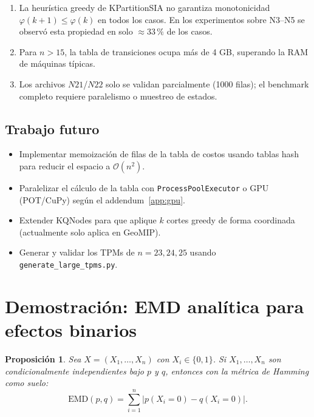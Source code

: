 \documentclass[11pt,letterpaper]{article}
\newcommand{\EMD}{\mathrm{EMD}}
\newcommand{\phi}{\varphi}
\newtheorem{proposition}{Proposición}[section]
\begin{document}
\begin{enumerate}
  \item La heurística greedy de KPartitionSIA no garantiza monotonicidad
        $\phi(k+1) \le \phi(k)$ en todos los casos.  En los experimentos
        sobre N3--N5 se observó esta propiedad en solo $\approx 33\,\%$
        de los casos.
  \item Para $n > 15$, la tabla de transiciones ocupa más de 4 GB,
        superando la RAM de máquinas típicas.
  \item Los archivos $N21$/$N22$ solo se validan parcialmente (1000 filas);
        el benchmark completo requiere paralelismo o muestreo de estados.
\end{enumerate}

\subsection{Trabajo futuro}

\begin{itemize}
  \item Implementar memoización de filas de la tabla de costos usando
        tablas hash para reducir el espacio a $\mathcal{O}(n^2)$.
  \item Paralelizar el cálculo de la tabla con \texttt{ProcessPoolExecutor}
        o GPU (POT/CuPy) según el addendum~\ref{app:gpu}.
  \item Extender KQNodes para que aplique $k$ cortes greedy de forma
        coordinada (actualmente solo aplica en GeoMIP).
  \item Generar y validar los TPMs de $n=23,24,25$ usando
        \texttt{generate\_large\_tpms.py}.
\end{itemize}

\appendix

\section{Demostración: EMD analítica para efectos binarios}
\label{app:emd}

\begin{proposition}
  Sea $X = (X_1,\ldots,X_n)$ con $X_i \in \{0,1\}$.  Si $X_1,\ldots,X_n$
  son condicionalmente independientes bajo $p$ y $q$, entonces con la métrica
  de Hamming como suelo:
  \[
    \EMD(p, q) = \sum_{i=1}^{n} |p(X_i = 0) - q(X_i = 0)|.
  \]
\end{proposition}
\end{document}
